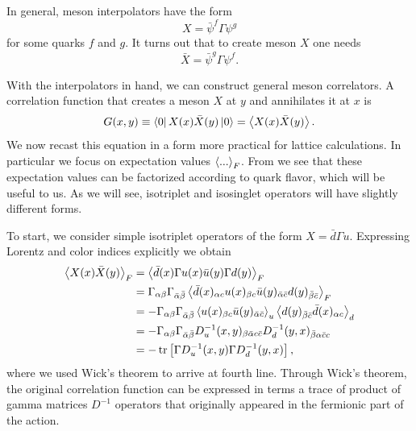 In general, meson interpolators have the
form
\begin{equation}\label{eq:mesonInterp}
 X=\bar{\psi}^f\Gamma\psi^g
\end{equation}
for some quarks $f$ and $g$. It turns out that to create meson $X$ one needs
\begin{equation}
 \bar{X}=\bar{\psi}^g\Gamma\psi^f.
\end{equation}

With the interpolators in hand, we can construct general meson correlators.
A correlation function 
that creates a meson $X$ at $y$ and annihilates it at $x$ is
\begin{equation}
  G(x,y)\equiv\bra{0}X(x)\bar{X}(y)\ket{0}=\ev{X(x)\bar{X}(y)}.
\end{equation} 
We now recast this equation in a form more practical for lattice calculations.
In particular we focus on expectation values $\ev{...}_F$. From
 we see that these expectation values can be factorized
according to quark flavor, which will be useful to us. As we will see,
isotriplet and isosinglet operators will have slightly different forms.

To start, we consider simple isotriplet operators of the form
$X=\bar{d}\Gamma u$. Expressing Lorentz and color indices explicitly we obtain 
\begin{equation}\begin{aligned}\label{eq:contraction}
\ev{X(x)\bar{X}(y)}_F&=\ev{\bar{d}(x)\Gamma u(x)\bar{u}(y)\Gamma d(y)}_F\\
&=
\Gamma_{\alpha\beta}\Gamma_{\bar{\alpha}\bar{\beta}}
\ev{\bar{d}(x)_{\alpha c}u(x)_{\beta c}\bar{u}(y)_{\bar\alpha\bar
c}d(y)_{\bar\beta \bar c}}_F\\
&=
-\Gamma_{\alpha\beta}\Gamma_{\bar{\alpha}\bar{\beta}}
\ev{u(x)_{\beta c}\bar{u}(y)_{\bar\alpha\bar c}}_u
\ev{d(y)_{\bar\beta \bar c}\bar{d}(x)_{\alpha c}}_d\\
&=
-\Gamma_{\alpha\beta}\Gamma_{\bar{\alpha}\bar{\beta}}
D^{-1}_u(x,y)_{\beta\bar\alpha c\bar c}
D^{-1}_d(y,x)_{\bar\beta\alpha \bar cc}\\
&=-\tr\left[\Gamma D_u^{-1}(x,y)\Gamma D_d^{-1}(y,x)\right],
\end{aligned}\end{equation}
where we used Wick's theorem to arrive at fourth line.
Through Wick's theorem, the original correlation function can be expressed in
terms a trace of product of gamma matrices $D^{-1}$ operators that originally
appeared in the fermionic part of the action. 

